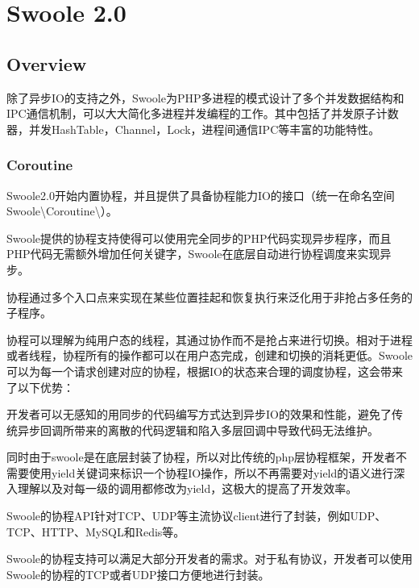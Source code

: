 \part{Swoole 2.0}

\chapter{Overview}

除了异步IO的支持之外，Swoole为PHP多进程的模式设计了多个并发数据结构和IPC通信机制，可以大大简化多进程并发编程的工作。其中包括了并发原子计数器，并发HashTable，Channel，Lock，进程间通信IPC等丰富的功能特性。


\section{Coroutine}


Swoole2.0开始内置协程，并且提供了具备协程能力IO的接口（统一在命名空间Swoole\textbackslash Coroutine\textbackslash *）。

Swoole提供的协程支持使得可以使用完全同步的PHP代码实现异步程序，而且PHP代码无需额外增加任何关键字，Swoole在底层自动进行协程调度来实现异步。


协程通过多个入口点来实现在某些位置挂起和恢复执行来泛化用于非抢占多任务的子程序。


协程可以理解为纯用户态的线程，其通过协作而不是抢占来进行切换。相对于进程或者线程，协程所有的操作都可以在用户态完成，创建和切换的消耗更低。Swoole可以为每一个请求创建对应的协程，根据IO的状态来合理的调度协程，这会带来了以下优势：

\begin{compactenum}
\item 开发者可以无感知的用同步的代码编写方式达到异步IO的效果和性能，避免了传统异步回调所带来的离散的代码逻辑和陷入多层回调中导致代码无法维护。

\item 同时由于swoole是在底层封装了协程，所以对比传统的php层协程框架，开发者不需要使用yield关键词来标识一个协程IO操作，所以不再需要对yield的语义进行深入理解以及对每一级的调用都修改为yield，这极大的提高了开发效率。

\end{compactenum}

Swoole的协程API针对TCP、UDP等主流协议client进行了封装，例如UDP、TCP、HTTP、MySQL和Redis等。


Swoole的协程支持可以满足大部分开发者的需求。对于私有协议，开发者可以使用Swoole的协程的TCP或者UDP接口方便地进行封装。


